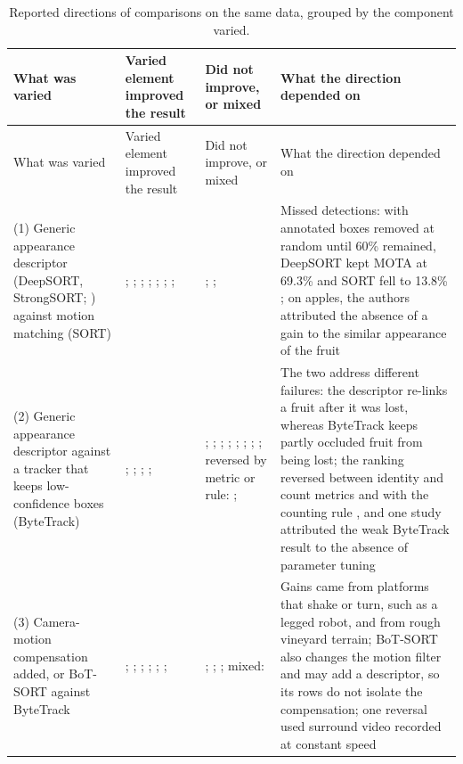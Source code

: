 \documentclass[a4paper,11pt]{article}
\begin{document}
\begin{footnotesize}
\setlength{\tabcolsep}{4pt}
\begin{longtable}{@{}L{2.8cm}L{3.6cm}L{3.5cm}L{5.0cm}@{}}
\caption{Reported directions of comparisons on the same data, grouped by the component varied.}\label{tab:comparison-register}\\
\toprule
What was varied & Varied element improved the result & Did not improve, or mixed & What the direction depended on\\
\midrule
\endfirsthead
\toprule
What was varied & Varied element improved the result & Did not improve, or mixed & What the direction depended on\\
\midrule
\endhead
\bottomrule
\endfoot
(1) Generic appearance descriptor (DeepSORT, StrongSORT; \citealp{wojke2017simple,du2023strongsort}) against motion matching (SORT) & \citet{vaishnavi2025fruit}; \citet{si2026citrus}; \citet{villacres2023apple}; \citet{piazolo2026enhanced}; \citet{poncemachete2025optimizing}; \citet{an2024stratracker}; \citet{feng2026greenhouse}; \citet{zhai2025dynamic} & \citet{zhang2022deep}; \citet{genemola2023video}; \citet{weng2026citrus} & Missed detections: with annotated boxes removed at random until 60\% remained, DeepSORT kept MOTA at 69.3\% and SORT fell to 13.8\% \citep{villacres2023apple}; on apples, the authors attributed the absence of a gain to the similar appearance of the fruit \citep{genemola2023video}\\
\addlinespace
(2) Generic appearance descriptor against a tracker that keeps low-confidence boxes (ByteTrack) & \citet{pai2024maturity}; \citet{an2024stratracker}; \citet{piazolo2026enhanced}; \citet{zhou2024advancing}; \citet{zhai2025dynamic} & \citet{genemola2023video}; \citet{poncemachete2025optimizing}; \citet{sekharamantry2024seamless}; \citet{huang2026mfft}; \citet{wu2025maturity}; \citet{weng2026citrus}; \citet{felippomes2026video}; \citet{feng2026greenhouse}; reversed by metric or rule: \citet{qi2025assessment}; \citet{zhang2025row} & The two address different failures: the descriptor re-links a fruit after it was lost, whereas ByteTrack keeps partly occluded fruit from being lost; the ranking reversed between identity and count metrics \citep{qi2025assessment} and with the counting rule \citep{zhang2025row}, and one study attributed the weak ByteTrack result to the absence of parameter tuning \citep{zhou2024advancing}\\
\addlinespace
(3) Camera-motion compensation added, or BoT-SORT against ByteTrack & \citet{zhang2024stablesort}; \citet{saraceni2024agrisort}; \citet{huang2019high}; \citet{felippomes2026video}; \citet{kemper2025performance}; \citet{zhai2025dynamic}; \citet{an2024stratracker} & \citet{zhou2024utilizing}; \citet{weng2026citrus}; \citet{feng2026greenhouse}; mixed: \citet{wei2025multi} & Gains came from platforms that shake or turn, such as a legged robot, and from rough vineyard terrain; BoT-SORT also changes the motion filter and may add a descriptor, so its rows do not isolate the compensation; one reversal used surround video recorded at constant speed\\

\end{longtable}
\end{footnotesize}
\end{document}

